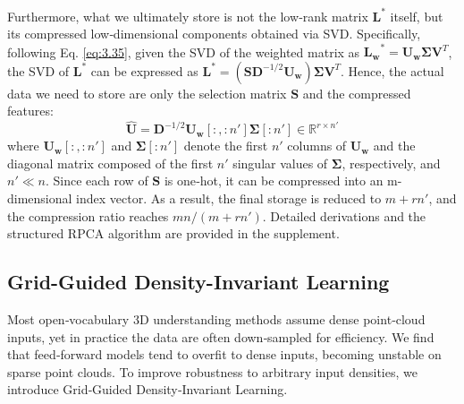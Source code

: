 \documentclass{article}
\begin{document}
Furthermore, what we ultimately store is not the low‑rank matrix $\mathbf{L}^*$ itself, but its compressed low‑dimensional components obtained via SVD. Specifically, following Eq. \eqref{eq:3.35}, given the SVD of the weighted matrix as $\mathbf{L_w}^* = \mathbf{U_w} \mathbf{\Sigma} \mathbf{V}^T$, the SVD of $\mathbf{L}^*$ can be expressed as $\mathbf{L}^* = (\mathbf{S} \mathbf{D}^{-1/2} \mathbf{U_w}) \mathbf{\Sigma} \mathbf{V}^T$. Hence, the actual data we need to store are only the selection matrix $\mathbf{S}$ and the compressed features:
\begin{equation}
    \hat{\mathbf{U}} = \mathbf{D}^{-1/2} \mathbf{U_w}[:,:n'] \mathbf{\Sigma}[:n'] \in \mathbb{R}^{r \times n'}
     \label{eq:3.310}
\end{equation}
where $\mathbf{U_w}[:,:n']$ and $\mathbf{\Sigma}[:n']$ denote the first $n'$ columns of $\mathbf{U_w}$ and the diagonal matrix composed of the first $n'$ singular values of $\mathbf{\Sigma}$, respectively, and $n' \ll n$.
Since each row of $\mathbf{S}$ is one‑hot, it can be compressed into an m-dimensional index vector. As a result, the final storage is reduced to $m + rn'$, and the compression ratio reaches $mn / (m + rn')$.
Detailed derivations and the structured RPCA algorithm are provided in the supplement.

\subsection{Grid-Guided Density-Invariant Learning}
Most open‑vocabulary 3D understanding methods assume dense point‑cloud inputs, yet in practice the data are often down‑sampled for efficiency. We find that feed‑forward models tend to overfit to dense inputs, becoming unstable on sparse point clouds. To improve robustness to arbitrary input densities, we introduce Grid‑Guided Density‑Invariant Learning.
\end{document}
